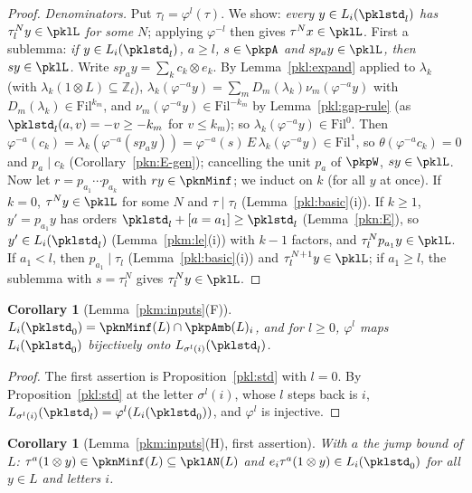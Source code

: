 \documentclass[10pt]{amsart}
\newtheorem{corollary}[theorem]{Corollary}
\theoremstyle{definition}
\theoremstyle{remark}
\newcommand{\Z}{\mathbb Z}
\begin{document}
\begin{proof}
\emph{Denominators.} Put $\tau_l=\varphi^l(\tau)$. We show: \emph{every $y\in L_i(\pklstd_l)$ has $\tau_l^Ny\in
\pklL$ for some $N$}; applying $\varphi^{-l}$ then gives $\tau^Nx\in\pklL$. First a sublemma: \emph{if $y\in
L_i(\pklstd_l)$, $a\ge l$, $s\in\pkpA$ and $sp_ay\in\pklL$, then $sy\in\pklL$.} Write $sp_ay=\sum_kc_k\otimes e_k$.
By Lemma~\ref{pkl:expand} applied to $\lambda_k$ (with $\lambda_k(1\otimes L)\subseteq\Z_\ell$), $\lambda_k(\varphi^{-a}
y)=\sum_mD_m(\lambda_k)\nu_m(\varphi^{-a}y)$ with $D_m(\lambda_k)\in\mathrm{Fil}^{k_m}$, and $\nu_m(\varphi^{-a}y)\in
\mathrm{Fil}^{-k_m}$ by Lemma~\ref{pkl:gap-rule} (as $\pklstd_l(a,v)=-v\ge-k_m$ for $v\le k_m$); so $\lambda_k
(\varphi^{-a}y)\in\mathrm{Fil}^0$. Then $\varphi^{-a}(c_k)=\lambda_k(\varphi^{-a}(sp_ay))=\varphi^{-a}(s)\,E\,
\lambda_k(\varphi^{-a}y)\in\mathrm{Fil}^1$, so $\theta(\varphi^{-a}c_k)=0$ and $p_a\mid c_k$ (Corollary~\ref{pkn:E-gen});
cancelling the unit $p_a$ of $\pkpW$, $sy\in\pklL$. Now let $r=p_{a_1}\cdots p_{a_k}$ with $ry\in\pknMinf$; we
induct on $k$ (for all $y$ at once). If $k=0$, $\tau^Ny\in\pklL$ for some $N$ and $\tau\mid\tau_l$
(Lemma~\ref{pkl:basic}(i)). If $k\ge1$, $y'=p_{a_1}y$ has orders $\pklstd_l+[a=a_1]\ge\pklstd_l$
(Lemma~\ref{pkn:E}), so $y'\in L_i(\pklstd_l)$ (Lemma~\ref{pkm:le}(i)) with $k-1$ factors, and
$\tau_l^Np_{a_1}y\in\pklL$. If $a_1<l$, then $p_{a_1}\mid\tau_l$ (Lemma~\ref{pkl:basic}(i)) and
$\tau_l^{N+1}y\in\pklL$; if $a_1\ge l$, the sublemma with $s=\tau_l^N$ gives $\tau_l^Ny\in\pklL$.
\end{proof}

\begin{corollary}[Lemma~\ref{pkm:inputs}(F)]\label{pkl:F}
$L_i(\pklstd_0)=\pknMinf(L)\cap\pkpAmb(L)_i$, and for $l\ge0$, $\varphi^l$ maps $L_i(\pklstd_0)$ bijectively onto
$L_{\sigma^l(i)}(\pklstd_l)$.
\end{corollary}

\begin{proof}
The first assertion is Proposition~\ref{pkl:std} with $l=0$. By Proposition~\ref{pkl:std} at the letter
$\sigma^l(i)$, whose $l$ steps back is $i$, $L_{\sigma^l(i)}(\pklstd_l)=\varphi^l(L_i(\pklstd_0))$, and $\varphi^l$
is injective.
\end{proof}

\begin{corollary}[Lemma~\ref{pkm:inputs}(H), first assertion]\label{pkl:H1}
With $a$ the jump bound of $L$: $\tau^a(1\otimes y)\in\pknMinf(L)\subseteq\pklAN(L)$ and
$e_i\tau^a(1\otimes y)\in L_i(\pklstd_0)$ for all $y\in L$ and letters $i$.
\end{corollary}
\end{document}
